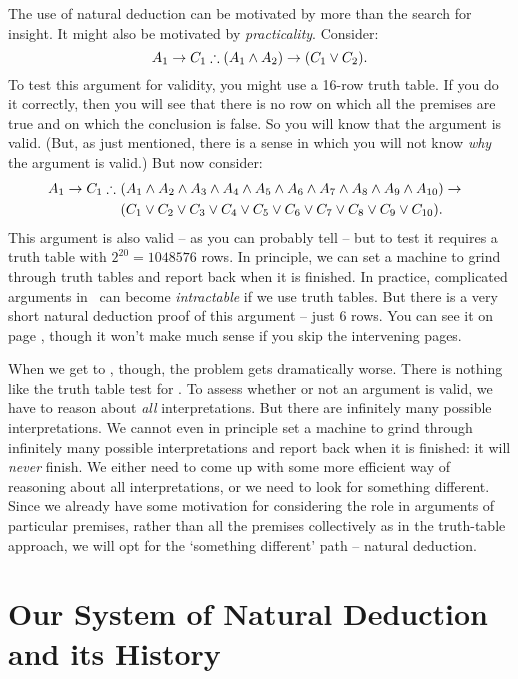 The use of natural deduction can be motivated by more than the search for insight. It might also be motivated by \emph{practicality}. Consider:
	$$A_1 \rightarrow C_1 \mathrel{\therefore} (A_1 \wedge A_2) \rightarrow (C_1 \vee C_2).$$
To test this argument for validity, you might use a 16-row truth table. If you do it correctly, then you will see that there is no row on which all the premises are true and on which the conclusion is false. So you will know that the argument is valid. (But, as just mentioned, there is a sense in which you will not know \emph{why} the argument is valid.) But now consider:\label{longtt}
	\begin{align*}
		A_1 \rightarrow C_1 \mathrel{\therefore}\ & (A_1 \wedge A_2 \wedge A_3 \wedge A_4 \wedge A_5 \wedge A_6 \wedge A_7 \wedge A_8 \wedge A_9 \wedge A_{10}) \rightarrow \phantom{(}\\
				&(C_1 \vee C_2 \vee C_3 \vee C_4 \vee C_5 \vee C_6 \vee C_7 \vee C_8 \vee C_9 \vee C_{10}).
	\end{align*}
This argument is also valid – as you can probably tell – but to test it requires a truth table with $2^{20} = 1048576$ rows. In principle, we can set a machine to grind through truth tables and report back when it is finished. In practice, complicated arguments in \TFL\ can become \emph{intractable} if we use truth tables. But there is a very short natural deduction proof of this argument – just 6 rows. You can see it on page \pageref{ndshort}, though it won't make much sense if you skip the intervening pages.

When we get to \FOL, though, the problem gets dramatically worse. There is nothing like the truth table test for \FOL. To assess whether or not an argument is valid, we have to reason about \emph{all} interpretations. But there are infinitely many possible interpretations. We cannot even in principle set a machine to grind through infinitely many possible interpretations and report back when it is finished: it will \emph{never} finish. We either need to come up with some more efficient way of reasoning about all interpretations, or we need to look for something different. Since we already have some motivation for considering the role in arguments of particular premises, rather than all the premises collectively as in the truth-table approach, we will opt for the `something different' path – natural deduction.

\section{Our System of Natural Deduction and its History} %
\label{sec:our_system_of_natural_deduction_and_its_history}


